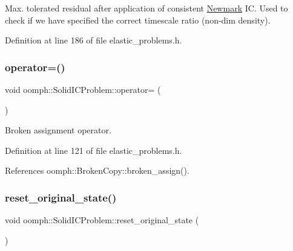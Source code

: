 Max. tolerated residual after application of consistent \hyperlink{classoomph_1_1Newmark}{Newmark} IC. Used to check if we have specified the correct timescale ratio (non-\/dim density). 



Definition at line 186 of file elastic\+\_\+problems.\+h.

\mbox{\label{classoomph_1_1SolidICProblem_a109d2237cf87ebf19793e5088f89761f}} 
\subsubsection{\texorpdfstring{operator=()}{operator=()}}
{\footnotesize\ttfamily void oomph\+::\+Solid\+I\+C\+Problem\+::operator= (\begin{DoxyParamCaption}\item[{const \hyperlink{classoomph_1_1SolidICProblem}{Solid\+I\+C\+Problem} \&}]{ }\end{DoxyParamCaption})\hspace{0.3cm}{\ttfamily [inline]}}



Broken assignment operator. 



Definition at line 121 of file elastic\+\_\+problems.\+h.



References oomph\+::\+Broken\+Copy\+::broken\+\_\+assign().

\mbox{\label{classoomph_1_1SolidICProblem_aa2cb88ac90e7d24cdd63a08a8a35eed6}} 
\subsubsection{\texorpdfstring{reset\+\_\+original\+\_\+state()}{reset\_original\_state()}}
{\footnotesize\ttfamily void oomph\+::\+Solid\+I\+C\+Problem\+::reset\+\_\+original\+\_\+state (\begin{DoxyParamCaption}{ }\end{DoxyParamCaption})\hspace{0.3cm}{\ttfamily [private]}}



